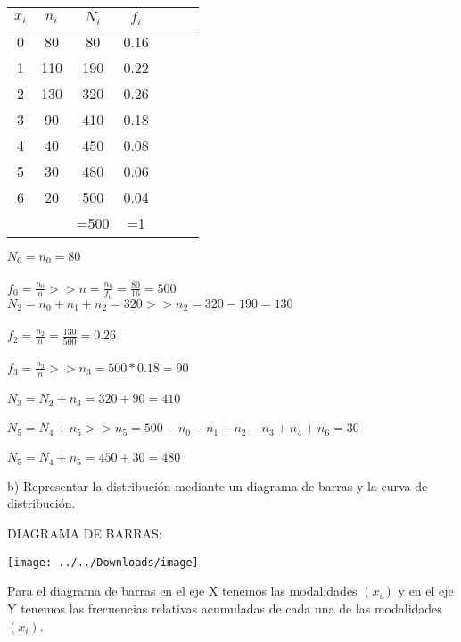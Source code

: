\documentclass{article}
\begin{document}
\begin{table}[t]
\begin{center}
\begin{tabular}{ | c | c | c | c | c | c | c | }
	
	\hline	
	$x_{i}$ & $n_{i}$ & $N_{i}$ & $f_{i}$ \\ \hline
	0 & 80 & 80  & 0.16 \\
	1 & 110 & 190  & 0.22  \\
	2 & 130 & 320 & 0.26 \\
	3 & 90 & 410  & 0.18 \\ 
	4 & 40 & 450  & 0.08  \\
	5 & 30 & 480 & 0.06 \\
	6 & 20 & 500 & 0.04 \\\hline
	 &  & =500 & =1 \\\hline
	 
\end{tabular}
	\end{center}
		$ N_{0} = n_{0} = 80 $\\ \\
		$ f_{0} = \frac{n_{0}}{n}  >> n = \frac{n_{0}}{f_{0}} =  \frac{80}{16} = 500 $\\ 
		$ N_{2} = n_{0} + n_{1} + n_{2} = 320  >> n_{2} = 320 - 190 = 130 $ \\ \\
		$ f_{2} = \frac{n_{2}}{n} = \frac{130}{500} = 0.26$\\ \\
		$ f_{3} = \frac{n_{3}}{n} >> n_{3} = 500 * 0.18 = 90 $\\ \\
		$ N_{3} =N_{2} + n_{3} = 320 + 90 = 410  $\\ \\
		$ N_{5} =N_{4} + n_{5}  >>  n_{5}= 500 - n_{0} - n_{1} + n_{2} -n_{3} + n_{4} + n_{6} = 30 $ \\ \\
		$ N_{5} =N_{4} + n_{5} = 450 + 30 = 480 $\\ 
		
		

\end{table}	
	
b) Representar la distribución mediante un diagrama de barras y la curva de distribución.

\begin{center}
DIAGRAMA DE BARRAS:
\begin{center}
\begin{center}
	\texttt{[image: ../../Downloads/image]}
\end{center}
\end{center}
Para el diagrama de barras en el eje X tenemos las modalidades $(x_{i})$ y en el eje Y tenemos las frecuencias relativas acumuladas de cada una de las modalidades $(x_{i})$. \\

\end{center}
\end{document}
